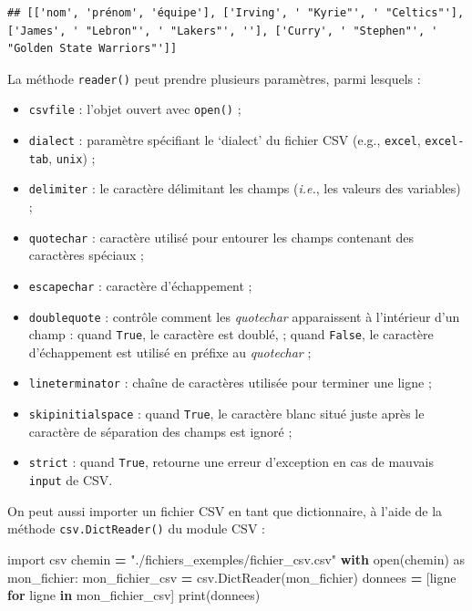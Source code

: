 \documentclass[12pt,]{book}
\newenvironment{Shaded}{\begin{snugshade}}{\end{snugshade}}
\newcommand{\KeywordTok}[1]{\textcolor[rgb]{0.13,0.29,0.53}{\textbf{#1}}}
\newcommand{\StringTok}[1]{\textcolor[rgb]{0.31,0.60,0.02}{#1}}
\newcommand{\ImportTok}[1]{#1}
\newcommand{\ControlFlowTok}[1]{\textcolor[rgb]{0.13,0.29,0.53}{\textbf{#1}}}
\newcommand{\OperatorTok}[1]{\textcolor[rgb]{0.81,0.36,0.00}{\textbf{#1}}}
\newcommand{\BuiltInTok}[1]{#1}
\newcommand{\NormalTok}[1]{#1}
\providecommand{\tightlist}{%
  \setlength{\itemsep}{0pt}\setlength{\parskip}{0pt}}
\numberwithin{equation}{section}
\numberwithin{countremarque}{section}
\begin{document}
\begin{lstlisting}
## [['nom', 'prénom', 'équipe'], ['Irving', ' "Kyrie"', ' "Celtics"'], ['James', ' "Lebron"', ' "Lakers"', ''], ['Curry', ' "Stephen"', ' "Golden State Warriors"']]
\end{lstlisting}

La méthode \texttt{reader()} peut prendre plusieurs paramètres, parmi
lesquels :

\begin{itemize}
\tightlist
\item
  \texttt{csvfile} : l'objet ouvert avec \texttt{open()} ;
\item
  \texttt{dialect} : paramètre spécifiant le `dialect' du fichier CSV
  (e.g., \texttt{excel}, \texttt{excel-tab}, \texttt{unix}) ;
\item
  \texttt{delimiter} : le caractère délimitant les champs (\emph{i.e.},
  les valeurs des variables) ;
\item
  \texttt{quotechar} : caractère utilisé pour entourer les champs
  contenant des caractères spéciaux ;
\item
  \texttt{escapechar} : caractère d'échappement ;
\item
  \texttt{doublequote} : contrôle comment les \emph{quotechar}
  apparaissent à l'intérieur d'un champ : quand \texttt{True}, le
  caractère est doublé, ; quand \texttt{False}, le caractère
  d'échappement est utilisé en préfixe au \emph{quotechar} ;
\item
  \texttt{lineterminator} : chaîne de caractères utilisée pour terminer
  une ligne ;
\item
  \texttt{skipinitialspace} : quand \texttt{True}, le caractère blanc
  situé juste après le caractère de séparation des champs est ignoré ;
\item
  \texttt{strict} : quand \texttt{True}, retourne une erreur d'exception
  en cas de mauvais \texttt{input} de CSV.
\end{itemize}

On peut aussi importer un fichier CSV en tant que dictionnaire, à l'aide
de la méthode \texttt{csv.DictReader()} du module CSV :

\begin{Shaded}
\begin{Highlighting}[]
\ImportTok{import}\NormalTok{ csv}
\NormalTok{chemin }\OperatorTok{=} \StringTok{"./fichiers_exemples/fichier_csv.csv"}
\ControlFlowTok{with} \BuiltInTok{open}\NormalTok{(chemin) }\ImportTok{as}\NormalTok{ mon_fichier:}
\NormalTok{    mon_fichier_csv }\OperatorTok{=}\NormalTok{ csv.DictReader(mon_fichier)}
\NormalTok{    donnees }\OperatorTok{=}\NormalTok{ [ligne }\ControlFlowTok{for}\NormalTok{ ligne }\KeywordTok{in}\NormalTok{ mon_fichier_csv]}
\BuiltInTok{print}\NormalTok{(donnees)}
\end{Highlighting}
\end{Shaded}
\end{document}
